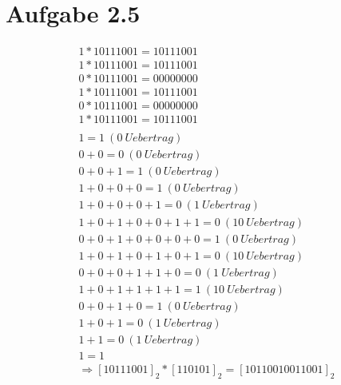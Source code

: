 \documentclass[12pt,a4paper]{article}
\begin{document}
\section*{Aufgabe 2.5}
\begin{align*}
1 * 10111001 = 10111001 \\
1 * 10111001 = 10111001 \\
0 * 10111001 = 00000000 \\
1 * 10111001 = 10111001 \\
0 * 10111001 = 00000000 \\
1 * 10111001 = 10111001 \\
\\
1 = 1 ~(0 ~Uebertrag) \\
0 + 0 = 0 ~(0 ~Uebertrag) \\
0 + 0 + 1 = 1 ~(0 ~Uebertrag) \\
1 + 0 + 0 + 0 = 1 ~(0 ~Uebertrag) \\
1 + 0 + 0 + 0 + 1 = 0 ~(1 ~Uebertrag) \\
1 + 0 + 1 + 0 + 0 + 1 + 1 = 0 ~(10 ~Uebertrag) \\
0 + 0 + 1 + 0 + 0 + 0 + 0 = 1 ~(0 ~Uebertrag) \\
1 + 0 + 1 + 0 + 1 + 0 + 1 = 0 ~(10 ~Uebertrag) \\
0 + 0 + 0 + 1 + 1 + 0 = 0 ~(1 ~Uebertrag) \\
1 + 0 + 1 + 1 + 1 + 1 = 1 ~(10 ~Uebertrag) \\
0 + 0 + 1 + 0 = 1 ~(0 ~Uebertrag) \\
1 + 0 + 1 = 0 ~(1 ~Uebertrag) \\
1 + 1 = 0 ~(1 ~Uebertrag) \\
1 = 1 \\
\Rightarrow [10111001]_{2} * [110101]_{2} = [10110010011001]_{2}
\end{align*}
\end{document}
